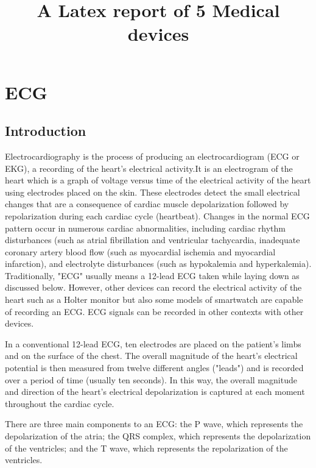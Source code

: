 \documentclass[12pt]{article}
\begin{document}
\title{A Latex report of 5 Medical devices}

\section{ECG}
\subsection{Introduction}
Electrocardiography is the process of producing an electrocardiogram (ECG or EKG), a recording of the heart's electrical activity.It is an electrogram of the heart which is a graph of voltage versus time of the electrical activity of the heart using electrodes placed on the skin. These electrodes detect the small electrical changes that are a consequence of cardiac muscle depolarization followed by repolarization during each cardiac cycle (heartbeat). Changes in the normal ECG pattern occur in numerous cardiac abnormalities, including cardiac rhythm disturbances (such as atrial fibrillation and ventricular tachycardia, inadequate coronary artery blood flow (such as myocardial ischemia and myocardial infarction), and electrolyte disturbances (such as hypokalemia and hyperkalemia).\\Traditionally, "ECG" usually means a 12-lead ECG taken while laying down as discussed below. However, other devices can record the electrical activity of the heart such as a Holter monitor but also some models of smartwatch are capable of recording an ECG. ECG signals can be recorded in other contexts with other devices.

In a conventional 12-lead ECG, ten electrodes are placed on the patient's limbs and on the surface of the chest. The overall magnitude of the heart's electrical potential is then measured from twelve different angles ("leads") and is recorded over a period of time (usually ten seconds). In this way, the overall magnitude and direction of the heart's electrical depolarization is captured at each moment throughout the cardiac cycle.

There are three main components to an ECG: the P wave, which represents the depolarization of the atria; the QRS complex, which represents the depolarization of the ventricles; and the T wave, which represents the repolarization of the ventricles.
\end{document}

